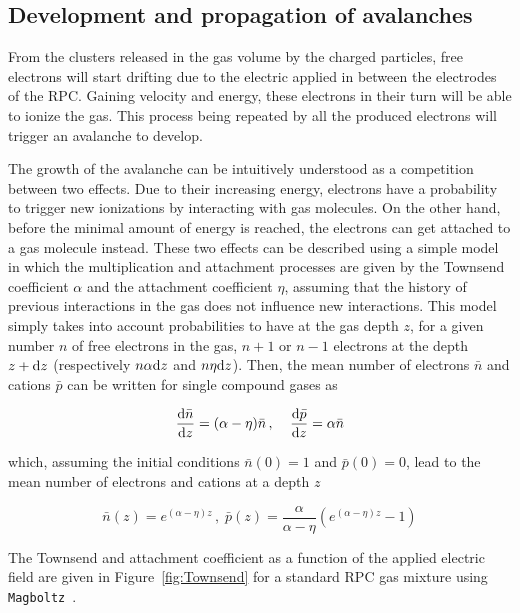 	\subsection{Development and propagation of avalanches}
	\label{chapt4:ssec:avalanche}
	
	From the clusters released in the gas volume by the charged particles, free electrons will start drifting due to the electric applied in between the electrodes of the RPC. Gaining velocity and energy, these electrons in their turn will be able to ionize the gas. This process being repeated by all the produced electrons will trigger an avalanche to develop.
	
	The growth of the avalanche can be intuitively understood as a competition between two effects. Due to their increasing energy, electrons have a probability to trigger new ionizations by interacting with gas molecules. On the other hand, before the minimal amount of energy is reached, the electrons can get attached to a gas molecule instead. These two effects can be described using a simple model in which the multiplication and attachment processes are given by the Townsend coefficient $\alpha$ and the attachment coefficient $\eta$, assuming that the history of previous interactions in the gas does not influence new interactions. This model simply takes into account probabilities to have at the gas depth $z$, for a given number $n$ of free electrons in the gas, $n+1$ or $n-1$ electrons at the depth $z+\mathrm{d} z$ (respectively $n\alpha\mathrm{d} z$ and $n\eta\mathrm{d} z$). Then, the mean number of electrons $\bar{n}$ and cations $\bar{p}$ can be written for single compound gases as
	
	\begin{equation}
	\label{eq:townsend}
	\frac{\mathrm{d}\bar{n}}{\mathrm{d} z} = (\alpha - \eta)\bar{n} \, , \;\;\;\; \frac{\mathrm{d}\bar{p}}{\mathrm{d} z} = \alpha\bar{n}
	\end{equation}
	
	which, assuming the initial conditions $\bar{n}(0) = 1$ and $\bar{p}(0) = 0$, lead to the mean number of electrons and cations at a depth $z$
	
	\begin{equation}
	\label{eq:Townsend-avalanche}
	\bar{n}(z) = e^{(\alpha - \eta)z} \, , \; \bar{p}(z) = \frac{\alpha}{\alpha - \eta}\left( e^{(\alpha - \eta)z} - 1\right)
	\end{equation}
	
	The Townsend and attachment coefficient as a function of the applied electric field are given in Figure~\ref{fig:Townsend} for a standard RPC gas mixture using \texttt{Magboltz}~\cite{MAGBOLTZ}.
	
